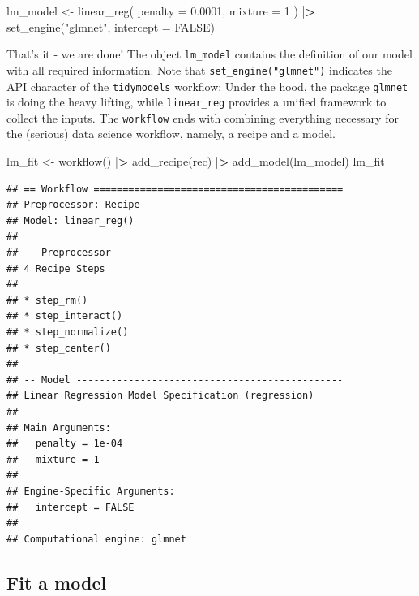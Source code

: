 \documentclass[
]{krantz}
\newenvironment{Shaded}{\begin{snugshade}}{\end{snugshade}}
\newcommand{\AttributeTok}[1]{\textcolor[rgb]{0.61,0.61,0.61}{#1}}
\newcommand{\ConstantTok}[1]{\textcolor[rgb]{0,0,0}{#1}}
\newcommand{\DecValTok}[1]{\textcolor[rgb]{0.06,0.06,0.06}{#1}}
\newcommand{\ErrorTok}[1]{\textcolor[rgb]{0.14,0.14,0.14}{\textbf{#1}}}
\newcommand{\FloatTok}[1]{\textcolor[rgb]{0.06,0.06,0.06}{#1}}
\newcommand{\FunctionTok}[1]{\textcolor[rgb]{0,0,0}{#1}}
\newcommand{\NormalTok}[1]{#1}
\newcommand{\OtherTok}[1]{\textcolor[rgb]{0.37,0.37,0.37}{#1}}
\newcommand{\SpecialCharTok}[1]{\textcolor[rgb]{0,0,0}{#1}}
\newcommand{\StringTok}[1]{\textcolor[rgb]{0.5,0.5,0.5}{#1}}
\begin{document}
\begin{Shaded}
\begin{Highlighting}[]
\NormalTok{lm\_model }\OtherTok{\textless{}{-}} \FunctionTok{linear\_reg}\NormalTok{(}
  \AttributeTok{penalty =} \FloatTok{0.0001}\NormalTok{,}
  \AttributeTok{mixture =} \DecValTok{1}
\NormalTok{) }\SpecialCharTok{|}\ErrorTok{\textgreater{}}
  \FunctionTok{set\_engine}\NormalTok{(}\StringTok{"glmnet"}\NormalTok{, }\AttributeTok{intercept =} \ConstantTok{FALSE}\NormalTok{)}
\end{Highlighting}
\end{Shaded}

That's it - we are done! The object \texttt{lm\_model} contains the definition of our model with all required information. Note that \texttt{set\_engine("glmnet")} indicates the API character of the \texttt{tidymodels} workflow: Under the hood, the package \texttt{glmnet} is doing the heavy lifting, while \texttt{linear\_reg} provides a unified framework to collect the inputs. The \texttt{workflow} ends with combining everything necessary for the (serious) data science workflow, namely, a recipe and a model.

\begin{Shaded}
\begin{Highlighting}[]
\NormalTok{lm\_fit }\OtherTok{\textless{}{-}} \FunctionTok{workflow}\NormalTok{() }\SpecialCharTok{|}\ErrorTok{\textgreater{}}
  \FunctionTok{add\_recipe}\NormalTok{(rec) }\SpecialCharTok{|}\ErrorTok{\textgreater{}}
  \FunctionTok{add\_model}\NormalTok{(lm\_model)}
\NormalTok{lm\_fit}
\end{Highlighting}
\end{Shaded}

\begin{verbatim}
## == Workflow ===========================================
## Preprocessor: Recipe
## Model: linear_reg()
## 
## -- Preprocessor ---------------------------------------
## 4 Recipe Steps
## 
## * step_rm()
## * step_interact()
## * step_normalize()
## * step_center()
## 
## -- Model ----------------------------------------------
## Linear Regression Model Specification (regression)
## 
## Main Arguments:
##   penalty = 1e-04
##   mixture = 1
## 
## Engine-Specific Arguments:
##   intercept = FALSE
## 
## Computational engine: glmnet
\end{verbatim}

\hypertarget{fit-a-model}{%
\subsection{Fit a model}\label{fit-a-model}}
\end{document}
